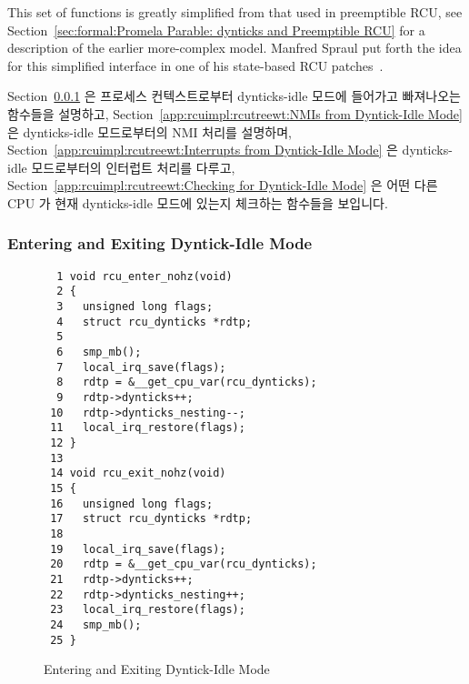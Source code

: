 This set of functions is greatly simplified from that used in
preemptible RCU, see
Section~\ref{sec:formal:Promela Parable: dynticks and Preemptible RCU}
for a description of the earlier more-complex model.
Manfred Spraul put forth the idea for this simplified interface in
one of his state-based RCU
patches~\cite{ManfredSpraul2008StateMachineRCU,ManfredSpraul2008dyntickIRQNMI}.
\fi

Section~\ref{app:rcuimpl:rcutreewt:Entering and Exiting Dyntick-Idle Mode}
은 프로세스 컨텍스트로부터 dynticks-idle 모드에 들어가고 빠져나오는 함수들을
설명하고,
Section~\ref{app:rcuimpl:rcutreewt:NMIs from Dyntick-Idle Mode}
은 dynticks-idle 모드로부터의 NMI 처리를 설명하며,
Section~\ref{app:rcuimpl:rcutreewt:Interrupts from Dyntick-Idle Mode}
은 dynticks-idle 모드로부터의 인터럽트 처리를 다루고,
Section~\ref{app:rcuimpl:rcutreewt:Checking for Dyntick-Idle Mode}
은 어떤 다른 CPU 가 현재 dynticks-idle 모드에 있는지 체크하는 함수들을
보입니다.
\iffalse

Section~\ref{app:rcuimpl:rcutreewt:Entering and Exiting Dyntick-Idle Mode}
describes the functions that enter and exit dynticks-idle mode from
process context,
Section~\ref{app:rcuimpl:rcutreewt:NMIs from Dyntick-Idle Mode}
describes the handling of NMIs from dynticks-idle mode,
Section~\ref{app:rcuimpl:rcutreewt:Interrupts from Dyntick-Idle Mode}
covers handling of interrupts from dynticks-idle mode, and
Section~\ref{app:rcuimpl:rcutreewt:Checking for Dyntick-Idle Mode}
presents functions that check whether some other CPU is currently in
dynticks-idle mode.
\fi

\subsubsection{Entering and Exiting Dyntick-Idle Mode}
\label{app:rcuimpl:rcutreewt:Entering and Exiting Dyntick-Idle Mode}

\begin{figure}[tbp]
{ \scriptsize
\begin{verbatim}
  1 void rcu_enter_nohz(void)
  2 {
  3   unsigned long flags;
  4   struct rcu_dynticks *rdtp;
  5
  6   smp_mb();
  7   local_irq_save(flags);
  8   rdtp = &__get_cpu_var(rcu_dynticks);
  9   rdtp->dynticks++;
 10   rdtp->dynticks_nesting--;
 11   local_irq_restore(flags);
 12 }
 13
 14 void rcu_exit_nohz(void)
 15 {
 16   unsigned long flags;
 17   struct rcu_dynticks *rdtp;
 18
 19   local_irq_save(flags);
 20   rdtp = &__get_cpu_var(rcu_dynticks);
 21   rdtp->dynticks++;
 22   rdtp->dynticks_nesting++;
 23   local_irq_restore(flags);
 24   smp_mb();
 25 }
\end{verbatim}
}
\caption{Entering and Exiting Dyntick-Idle Mode}
\label{fig:app:rcuimpl:rcutreewt:Entering and Exiting Dyntick-Idle Mode}
\end{figure}

